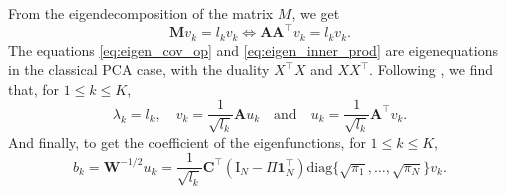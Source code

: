 From the eigendecomposition of the matrix $M$, we get
\begin{equation}\label{eq:eigen_inner_prod}
    \mathbf{M}v_k = l_k v_k \Longleftrightarrow \mathbf{A}\mathbf{A}^\top v_k = l_k v_k.
\end{equation}
The equations \eqref{eq:eigen_cov_op} and \eqref{eq:eigen_inner_prod} are eigenequations in the classical PCA case, with the duality $X^\top X$ and $XX^\top$. Following \cite{pagesMultipleFactorAnalysis2014,hardleAppliedMultivariateStatistical2019}, we find that, for $1 \leq k \leq K$,
\begin{equation}
    \lambda_k = l_k, \quad v_k = \frac{1}{\sqrt{l_k}}\mathbf{A} u_k \quad\text{and}\quad u_k = \frac{1}{\sqrt{l_k}} \mathbf{A}^\top v_k.
\end{equation}
And finally, to get the coefficient of the eigenfunctions, for $1 \leq k \leq K$,
\begin{equation}
    b_k = \mathbf{W}^{-1/2}u_k = \frac{1}{\sqrt{l_k}} \mathbf{C}^\top \left(\mathrm{I}_{\!N} - \Pi\mathbf{1}_{\!N}^\top\right) \text{diag}\{\sqrt{\pi_1}, \dots, \sqrt{\pi_N}\}v_k.
\end{equation}

